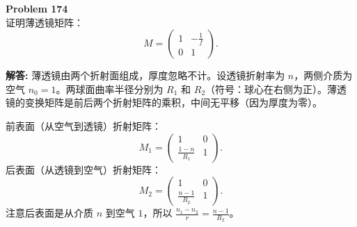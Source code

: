 \documentclass[12pt, a4paper, oneside]{ctexart}
\newenvironment{solution}{\par\noindent\textbf{解答:}\quad}{\par}
\begin{document}
\begin{mdframed}[backgroundcolor=gray!10, linewidth=0pt]
    \textbf{Problem 174} \\
    证明薄透镜矩阵：
    \[
    M = \begin{pmatrix} 1 & -\frac{1}{f} \\ 0 & 1 \end{pmatrix}.
    \]
\end{mdframed}
\begin{solution}
    薄透镜由两个折射面组成，厚度忽略不计。设透镜折射率为 $n$，两侧介质为空气 $n_0=1$。两球面曲率半径分别为 $R_1$ 和 $R_2$（符号：球心在右侧为正）。薄透镜的变换矩阵是前后两个折射矩阵的乘积，中间无平移（因为厚度为零）。

    前表面（从空气到透镜）折射矩阵：
    \[
    M_1 = \begin{pmatrix} 1 & 0 \\ \frac{1-n}{R_1} & 1 \end{pmatrix}.
    \]
    后表面（从透镜到空气）折射矩阵：
    \[
    M_2 = \begin{pmatrix} 1 & 0 \\ \frac{n-1}{R_2} & 1 \end{pmatrix}.
    \]
    注意后表面是从介质 $n$ 到空气 $1$，所以 $\frac{n_1 - n_2}{r} = \frac{n-1}{R_2}$。


\end{solution}
\end{document}
